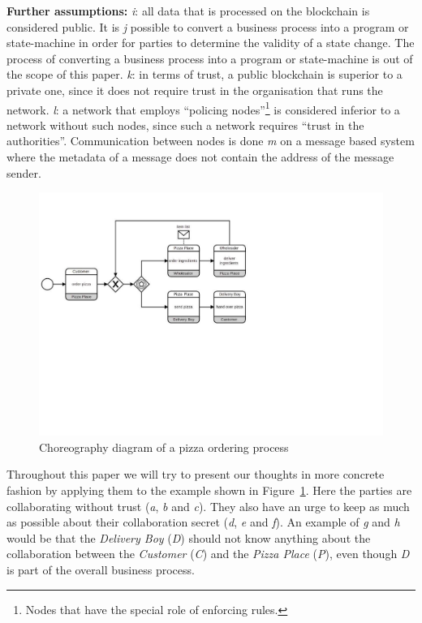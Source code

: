\documentclass[runningheads]{llncs}
\newcommand{\ber}[1]{\textit{#1}}
\newcommand{\reffig}[1]{Figure~\ref{#1}}
\newcommand{\noteme}[1]{\todo{#1}}
\renewcommand{\bigbreak}{}
\newcommand{\quotel}{``}
\newcommand{\quoter}{''}
\begin{document}
\bigbreak
\textbf{Further assumptions:}
\ber{i}: all data that is processed on the blockchain is considered public. It is \ber{j} possible to convert a business process into a program or state-machine in order for parties to determine the validity of a state change. The process of converting a business process into a program or state-machine is out of the scope of this paper. \ber{k}: in terms of trust, a public blockchain is superior to a private one, since it does not require trust in the organisation that runs the network. \ber{l}: a network that employs \quotel  policing nodes\quoter  \footnote{Nodes that have the special role of enforcing rules.} is considered inferior to a network without such nodes, since such a network requires \quotel trust in the authorities\quoter . Communication between nodes is done \ber{m} on a message based system where the metadata of a message does not contain the address of the message sender.

\begin{center}
\begin{figure}
    \centering
    \includegraphics[trim=0cm 9.5cm 11.5cm 2.4cm,clip=true,scale=0.65]{newbpmn.pdf}
    \caption{Choreography diagram of a pizza ordering process} 
    \label{fig:simple_bpmn}
\end{figure}
\end{center}


Throughout this paper we will try to present our thoughts in more concrete fashion by applying them to the example shown in \reffig{fig:simple_bpmn}. Here the parties are collaborating without trust (\ber{a}, \ber{b} and \ber{c}). They also have an urge to keep as much as possible about their collaboration secret (\ber{d}, \ber{e} and \ber{f}). An example of \ber{g} and \ber{h} would be that the \textit{Delivery Boy} (\ber{D})
 should not know anything about the collaboration between the \textit{Customer} (\ber{C}) and the \textit{Pizza Place} (\ber{P}), even though \ber{D} is part of the overall business process. 
\end{document}
